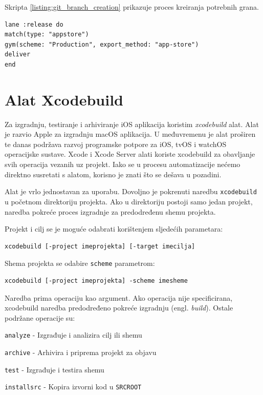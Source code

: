 \documentclass[times, utf8, diplomski, numeric]{fer}
\newcommand{\eng}[1]{(engl. \textit{#1})}
\begin{document}
\begin{appendices}
Skripta \ref{listing:git_branch_creation} prikazuje proces kreiranja potrebnih grana.

\begin{lstlisting}[caption=Isporuka na App Store platformu korištenjem dodatka deliver]
lane :release do
match(type: "appstore")
gym(scheme: "Production", export_method: "app-store")
deliver
end
\end{lstlisting}


\chapter{Alat Xcodebuild}

Za izgradnju, testiranje i arhiviranje iOS aplikacija koristim \textit{xcodebuild} alat. Alat je razvio Apple za izgradnju macOS aplikacija. U međuvremenu je alat proširen te danas podržava razvoj programske potpore za iOS, tvOS i watchOS operacijske sustave. Xcode i Xcode Server alati koriste xcodebuild za obavljanje svih operacija vezanih uz projekt. Iako se u procesu automatizacije nećemo direktno susretati s alatom, korisno je znati što se dešava u pozadini.

Alat je vrlo jednostavan za uporabu. Dovoljno je pokrenuti naredbu \verb|xcodebuild| u početnom direktoriju projekta. Ako u direktoriju postoji samo jedan projekt, naredba pokreće proces izgradnje za predodređenu shemu projekta.

Projekt i cilj se je moguće odabrati korištenjem sljedećih parametara:

\begin{verbatim}
xcodebuild [-project imeprojekta] [-target imecilja]
\end{verbatim}

Shema projekta se odabire \verb|scheme| parametrom:

\begin{verbatim}
xcodebuild [-project imeprojekta] -scheme imesheme
\end{verbatim}

Naredba prima operaciju kao argument. Ako operacija nije specificirana, xcodebuild naredba predodređeno pokreće izgradnju \eng{build}. Ostale podržane operacije su:

\verb|analyze| - Izgrađuje i analizira cilj ili shemu

\verb|archive| - Arhivira i priprema projekt za objavu

\verb|test| - Izgrađuje i testira shemu

\verb|installsrc| - Kopira izvorni kod u \verb|SRCROOT|


\end{appendices}
\end{document}
